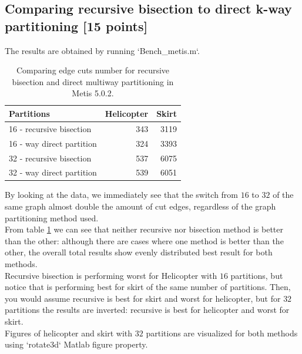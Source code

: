 \documentclass[unicode,11pt,a4paper,oneside,numbers=endperiod,openany]{scrartcl}
\begin{document}
\subsection{Comparing recursive bisection to direct k-way partitioning [15 points]}

The results are obtained by running `Bench\_metis.m`.

\begin{table}[H]
    \caption{Comparing edge cuts number for recursive bisection and direct multiway partitioning in Metis 5.0.2.}
    \centering
    \begin{tabular}{l|r|r} \hline\hline
        Partitions                & Helicopter & Skirt \\ \hline
        16 - recursive bisection  & 343        & 3119  \\
        16 - way direct partition & 324        & 3393  \\
        32 - recursive bisection  & 537        & 6075  \\
        32 - way direct partition & 539        & 6051  \\  \hline \hline
    \end{tabular}
    \label{table:compare_metis}
\end{table}

By looking at the data, we immediately see that the switch from $16$ to $32$ of the same graph almost
double the amount of cut edges, regardless of the graph partitioning method used. \\

From table \ref{table:compare_metis} we can see that neither recursive nor bisection method is better
than the other:
although there are cases where one method is better than the other, the overall total results show evenly distributed
best result for both methods.\\

Recursive bisection is performing worst for Helicopter with $16$ partitions, but notice that is
performing best for skirt of the same number of partitions.
Then, you would assume recursive is best for skirt and worst for helicopter, but for $32$ partitions the results are inverted:
recursive is best for helicopter and worst for skirt.\\

Figures of helicopter and skirt with $32$ partitions are visualized for both methods using `rotate3d` Matlab figure property. \\
\end{document}
